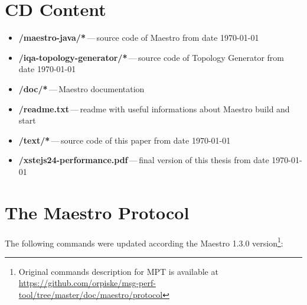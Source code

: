 

\chapter{CD Content}
\label{CD Content}

\begin{itemize}
  \item \textbf{/maestro-java/*}\,---\,source code of Maestro from date \today
  \item \textbf{/iqa-topology-generator/*}\,---\,source code of Topology Generator from date \today
  \item \textbf{/doc/*}\,---\,Maestro documentation
  \item \textbf{/readme.txt}\,---\,readme with useful informations about Maestro build and start
  \item \textbf{/text/*}\,---\,source code of this paper from date \today
  \item \textbf{/xstejs24-performance.pdf}\,---\,final version of this thesis from date \today
\end{itemize}

\chapter{The Maestro Protocol}
\label{AP:commands}
The following commands were updated according the Maestro 1.3.0 version\footnote{Original commands description for MPT is available at \url{https://github.com/orpiske/msg-perf-tool/tree/master/doc/maestro/protocol}}:

